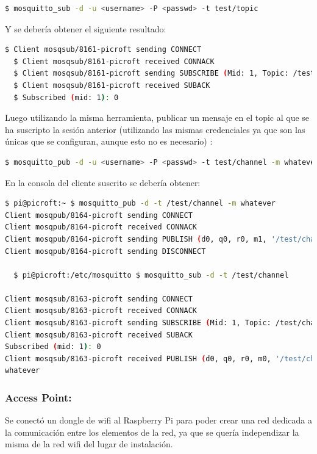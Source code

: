 \begin{lstlisting}[language=bash]
  $ mosquitto_sub -d -u <username> -P <passwd> -t test/topic
\end{lstlisting}

Y se debería obtener el siguiente resultado:

\begin{lstlisting}[language=bash]
  $ Client mosqsub/8161-picroft sending CONNECT
  $ Client mosqsub/8161-picroft received CONNACK
  $ Client mosqsub/8161-picroft sending SUBSCRIBE (Mid: 1, Topic: /test/topic, QoS: 0)
  $ Client mosqsub/8161-picroft received SUBACK
  $ Subscribed (mid: 1): 0
\end{lstlisting}

Luego utilizando la misma herramienta, publicar un mensaje en el topic al que se ha suscripto la sesión anterior (utilizando las mismas credenciales ya que son las únicas que se configuran, aunque esto no es necesario) :

\begin{lstlisting}[language=bash]
  $ mosquitto_pub -d -u <username> -P <passwd> -t test/channel -m whatever
\end{lstlisting}

En la consola del cliente suscrito se debería obtener:

\begin{lstlisting}[language=bash]
  $ pi@picroft:~ $ mosquitto_pub -d -t /test/channel -m whatever
Client mosqpub/8164-picroft sending CONNECT
Client mosqpub/8164-picroft received CONNACK
Client mosqpub/8164-picroft sending PUBLISH (d0, q0, r0, m1, '/test/channel', ... (8 bytes))
Client mosqpub/8164-picroft sending DISCONNECT

  $ pi@picroft:/etc/mosquitto $ mosquitto_sub -d -t /test/channel

Client mosqsub/8163-picroft sending CONNECT
Client mosqsub/8163-picroft received CONNACK
Client mosqsub/8163-picroft sending SUBSCRIBE (Mid: 1, Topic: /test/channel, QoS: 0)
Client mosqsub/8163-picroft received SUBACK
Subscribed (mid: 1): 0
Client mosqsub/8163-picroft received PUBLISH (d0, q0, r0, m0, '/test/channel', ... (8 bytes))
whatever
\end{lstlisting}

\subsubsection{Access Point:}

Se conectó un dongle de wifi al Raspberry Pi para poder crear una red dedicada a la comunicación entre los elementos de la red, ya que se quería independizar la misma de la red wifi del lugar de instalación.~\cite{AccessPoint}

